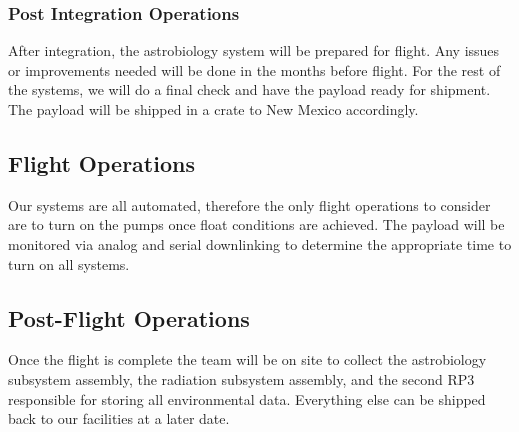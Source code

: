 \subsubsection{Post Integration Operations}

After integration, the astrobiology system will be prepared for flight.  Any issues or improvements needed will be done in the months before flight. For the rest of the systems, we will do a final check and have the payload ready for shipment.  The payload will be shipped in a crate to New Mexico accordingly.

\subsection{Flight Operations}
Our systems are all automated, therefore the only flight operations to consider are to turn on the pumps once float conditions are achieved. The payload will be monitored via analog and serial  downlinking to determine the appropriate time to turn on all systems. 

\subsection{Post-Flight Operations}
Once the flight is complete the team will be on site to collect the astrobiology subsystem assembly, the radiation subsystem assembly, and the second RP3 responsible for storing all environmental data. Everything else can be shipped back to our facilities at a later date.  



